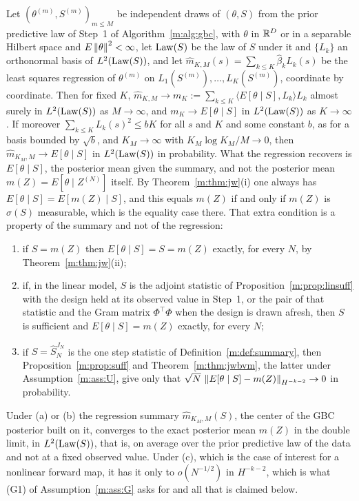 \begin{theorem}\label{m:thm:lsmgbc}
Let $(\theta^{(m)},S^{(m)})_{m\le M}$ be independent draws of $(\theta,S)$ from the prior predictive law of Step~1 of Algorithm~\ref{m:alg:gbc}, with $\theta$ in $\mathbb{R}^D$ or in a separable Hilbert space and $E\left\|\theta\right\|^2<\infty$, let $\operatorname{Law}(S)$ be the law of $S$ under it and $\{L_k\}$ an orthonormal basis of $L^2(\operatorname{Law}(S))$, and let $\hat m_{K,M}(s)=\sum_{k\le K}\hat\beta_kL_k(s)$ be the least squares regression of $\theta^{(m)}$ on $L_1(S^{(m)}),\dots,L_K(S^{(m)})$, coordinate by coordinate. Then for fixed $K$, $\hat m_{K,M}\to m_K:=\sum_{k\le K}\langle E[\theta\mid S],L_k\rangle L_k$ almost surely in $L^2(\operatorname{Law}(S))$ as $M\to\infty$, and $m_K\to E[\theta\mid S]$ in $L^2(\operatorname{Law}(S))$ as $K\to\infty$. If moreover $\sum_{k\le K}L_k(s)^2\le bK$ for all $s$ and $K$ and some constant $b$, as for a basis bounded by $\sqrt b$, and $K_M\to\infty$ with $K_M\log K_M/M\to0$, then $\hat m_{K_M,M}\to E[\theta\mid S]$ in $L^2(\operatorname{Law}(S))$ in probability. What the regression recovers is $E[\theta\mid S]$, the posterior mean given the summary, and not the posterior mean $m(Z)=E[\theta\mid Z^{(N)}]$ itself. By Theorem~\ref{m:thm:jw}(i) one always has $E[\theta\mid S]=E[m(Z)\mid S]$, and this equals $m(Z)$ if and only if $m(Z)$ is $\sigma(S)$ measurable, which is the equality case there. That extra condition is a property of the summary and not of the regression:
\begin{enumerate}[label=(\alph*),nosep]
\item if $S=m(Z)$ then $E[\theta\mid S]=S=m(Z)$ exactly, for every $N$, by Theorem~\ref{m:thm:jw}(ii);
\item if, in the linear model, $S$ is the adjoint statistic of Proposition~\ref{m:prop:linsuff} with the design held at its observed value in Step~1, or the pair of that statistic and the Gram matrix $\Phi^\top\Phi$ when the design is drawn afresh, then $S$ is sufficient and $E[\theta\mid S]=m(Z)$ exactly, for every $N$;
\item if $S=\hat S^{J_N}_N$ is the one step statistic of Definition~\ref{m:def:summary}, then Proposition~\ref{m:prop:suff} and Theorem~\ref{m:thm:jwbvm}, the latter under Assumption~\ref{m:ass:U}, give only that $\sqrt N\,\left\|E[\theta\mid S]-m(Z)\right\|_{H^{-k-2}}\to0$ in probability.
\end{enumerate}
Under (a) or (b) the regression summary $\hat m_{K_M,M}(S)$, the center of the GBC posterior built on it, converges to the exact posterior mean $m(Z)$ in the double limit, in $L^2(\operatorname{Law}(S))$, that is, on average over the prior predictive law of the data and not at a fixed observed value. Under (c), which is the case of interest for a nonlinear forward map, it has it only to $o(N^{-1/2})$ in $H^{-k-2}$, which is what (G1) of Assumption~\ref{m:ass:G} asks for and all that is claimed below.
\end{theorem}

